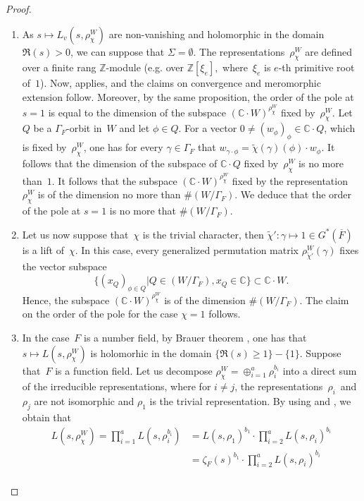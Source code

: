 \documentclass[a4paper,english,12pt]{amsart}
\newcommand{\CC}{\mathbb{C}}
\newcommand{\oF}{\overline F}
\newcommand{\ZZ}{\mathbb{Z}}
\newcommand{\wchi}{\widetilde{\chi}}
\numberwithin{equation}{subsection}
\begin{document}
\begin{proof}
\begin{enumerate}
\item As $s\mapsto L_v(s,\rho^W_{\chi})$ are non-vanishing and holomorphic in the domain $\Re(s)>0$, we can suppose that $\Sigma=\emptyset$. The representations~$\rho^W_{\chi}$ are defined over a finite rang $\ZZ$-module (e.g. over $\ZZ[\xi_e],$ where~$\xi_e$ is $e$-th primitive root of~$1$). Now, \cite[Proposition 2.49]{bourquifzh} applies, and the claims on convergence and meromorphic extension follow. Moreover, by the same proposition, the order of the pole at~$s=1$ is equal to the dimension of the subspace $(\CC\cdot W)^{\rho_{\chi}^W}$ fixed by~$\rho^W_{\chi}$. Let~$Q$ be a $\Gamma_F$-orbit in~$W$ and let $\phi\in Q$. For a vector $0\neq (w_{\phi})_{\phi}\in\CC\cdot Q$, which is fixed by~$\rho^W_{\chi}$, one has for every $\gamma\in\Gamma_F$ that $w_{\gamma\cdot\phi}=\widetilde\chi(\gamma)(\phi)\cdot w_{\phi}$. It follows that the dimension of the subspace of $\CC\cdot Q$ fixed by~$\rho^W_{\chi}$ is no more than~$1$. It follows that the subspace $(\CC\cdot W)^{\rho^W_{\chi}}$ fixed by the representation $\rho^{W}_{\chi}$ is of the dimension no more than $\# (W/\Gamma_F)$. We deduce that the order of the pole at $s=1$ is no more that $\#(W/\Gamma_F)$. 
\item Let us now suppose that~$\chi$ is the trivial character, then $\wchi':\gamma\mapsto 1\in G^*(\oF)$ is a lift of~$\chi$. In this case, every generalized permutation matrix $\rho^W_{\wchi'}(\gamma)$ fixes the vector subspace $$\{(x_Q)_{\phi\in Q}|Q\in(W/\Gamma_F), x_Q\in\CC\} \subset \CC\cdot W.$$ Hence, the subspace $(\CC\cdot W)^{\rho^W_{\chi}}$ is of the dimension $\# (W/\Gamma_F)$.  The claim on the order of the pole for the case $\chi=1$ follows.
\item In the case~$F$ is a number field, by Brauer theorem \cite{brauertheorem}, one has that $s\mapsto L(s,\rho^W_{\chi})$ is holomorhic in the domain $\{\Re(s)\geq 1\}-\{1\}$. Suppose that~$F$ is a function field. Let us decompose $\rho^W_{\chi}=\oplus_{i=1}^a\rho_i^{b_i}$ into a direct sum of the irreducible representations, where for $i\neq j$, the representations~$\rho_i$~and $\rho_j$ are not isomorphic and $\rho_1$ is the trivial representation. By using \cite[Page 196]{Milne} and \cite[Chapter VII, \S 6, Theorem 4]{basicnt}, we obtain that \begin{align*}
L(s,\rho^W_{\chi})=\prod_{i=1}^aL(s,\rho_i^{b_i})&=L(s,\rho_1)^{b_1}\cdot\prod_{i=2}^aL(s,\rho_i)^{b_i}\\&=\zeta_F(s)^{b_1}\cdot \prod_{i=2}^aL(s,\rho_i)^{b_i}\\

\end{align*}
\end{enumerate}
\end{proof}
\end{document}
